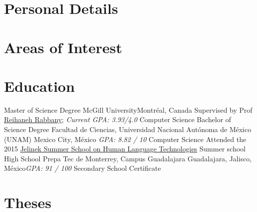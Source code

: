 \documentclass[8pt,a4paper,sans]{moderncv} %
\begin{document}
\makecvtitle %

\section{Personal Details}

\section{Areas of Interest}


\section{Education}

        {Master of Science Degree}
        {McGill University}{Montréal, Canada}
        {Supervised by Prof \href{http://www.reirab.com}{Reihaneh Rabbany}; \textit{Current GPA: 3.93/4.0}}
        {Computer Science}
        {Bachelor of Science Degree}
        {Facultad de Ciencias, Universidad Nacional Autónoma de México (UNAM)}
        {Mexico City, México}
        {\textit{GPA: 8.82 / 10}}
        {Computer Science}
        {Attended the 2015 \href{https://www2.ee.washington.edu/news/2015JelinekWorkshopSummerSchool.html}{Jelinek Summer School on Human Language Technologies}}
        {Summer school}
        {}{}{}
        {High School}
        {Prepa Tec de Monterrey, Campus Guadalajara}
        {Guadalajara, Jalisco, México}{\textit{GPA: 91 / 100}}
        {Secondary School Certificate}

\section{Theses}
\end{document}
